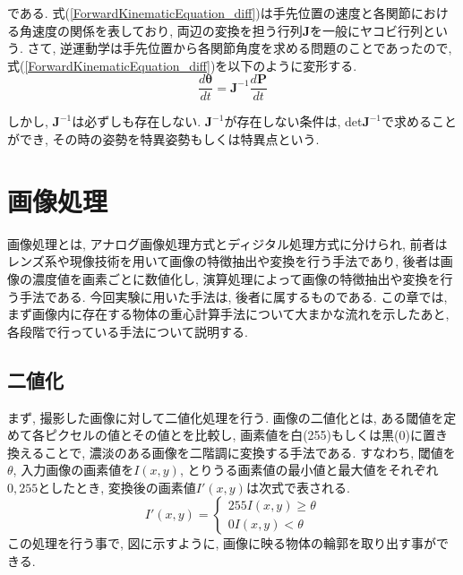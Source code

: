 \documentclass{suribt}
\begin{document}
である. 式(\ref{ForwardKinematicEquation_diff})は手先位置の速度と各関節における角速度の関係を表しており, 両辺の変換を担う行列${\bm J}$を一般にヤコビ行列という. 
さて, 逆運動学は手先位置から各関節角度を求める問題のことであったので, 式(\ref{ForwardKinematicEquation_diff})を以下のように変形する.
\begin{equation}
	\label{ForwardKinematicEquation_diff}
	\frac{d{\bm \theta}}{dt} = {\bm J}^{-1}\frac{d{\bm P}}{dt}
\end{equation}

しかし, ${\bm J^{-1}}$は必ずしも存在しない. ${\bm J^{-1}}$が存在しない条件は, det${\bm J^{-1}}$で求めることができ, その時の姿勢を特異姿勢もしくは特異点という. 

\chapter{画像処理}
画像処理とは, アナログ画像処理方式とディジタル処理方式に分けられ, 前者はレンズ系や現像技術を用いて画像の特徴抽出や変換を行う手法であり, 後者は画像の濃度値を画素ごとに数値化し, 演算処理によって画像の特徴抽出や変換を行う手法である. 今回実験に用いた手法は, 後者に属するものである. この章では, まず画像内に存在する物体の重心計算手法について大まかな流れを示したあと, 各段階で行っている手法について説明する.
\section{二値化}
まず, 撮影した画像に対して二値化処理を行う. 
画像の二値化とは, ある閾値を定めて各ピクセルの値とその値とを比較し, 画素値を白(255)もしくは黒(0)に置き換えることで, 濃淡のある画像を二階調に変換する手法である. すなわち, 閾値を$\theta$, 入力画像の画素値を$I(x, y)$, とりうる画素値の最小値と最大値をそれぞれ$0, 255$としたとき, 変換後の画素値$I'(x, y)$は次式で表される. 
\begin{equation}
	I'(x, y) = \left \{
		\begin{array}{c}
			255  I(x, y) \geq \theta \\
			 0    I(x, y) < \theta
		\end{array}
	\right.
\end{equation}
この処理を行う事で, 図に示すように, 画像に映る物体の輪郭を取り出す事ができる.
\end{document}
